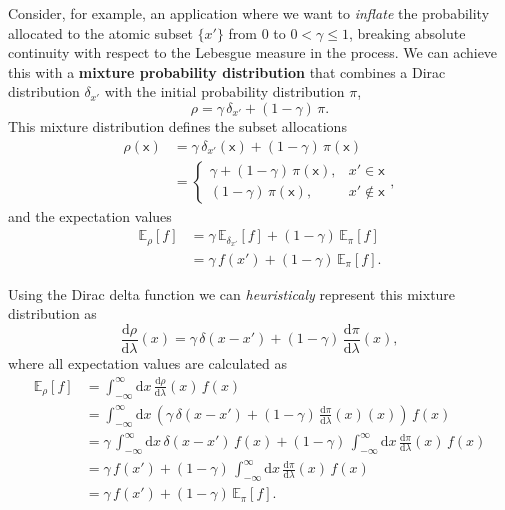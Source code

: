 \documentclass[
  letterpaper,
  DIV=11,
  numbers=noendperiod]{scrartcl}
\begin{document}
Consider, for example, an application where we want to \emph{inflate}
the probability allocated to the atomic subset \(\{ x' \}\) from \(0\)
to \(0 < \gamma \le 1\), breaking absolute continuity with respect to
the Lebesgue measure in the process. We can achieve this with a
\textbf{mixture probability distribution} that combines a Dirac
distribution \(\delta_{x'}\) with the initial probability distribution
\(\pi\), \[
\rho = \gamma \, \delta_{x'} + (1 - \gamma) \, \pi.
\] This mixture distribution defines the subset allocations
\begin{align*}
\rho(\mathsf{x})
&=
  \gamma \, \delta_{x'}(\mathsf{x})
+ (1 - \gamma) \, \pi(\mathsf{x})
\\
&=
\left\{
\begin{array}{rr}
\gamma + (1 - \gamma) \, \pi(\mathsf{x}), & x' \in \mathsf{x} \\
(1 - \gamma) \, \pi(\mathsf{x}), & x' \notin \mathsf{x}
\end{array}
\right. ,
\end{align*} and the expectation values \begin{align*}
\mathbb{E}_{\rho}[f]
&=
  \gamma \, \mathbb{E}_{\delta_{x'}}[f]
+ (1 - \gamma) \, \mathbb{E}_{\pi}[f]
\\
&=
\gamma \, f(x') + (1 - \gamma) \, \mathbb{E}_{\pi}[f].
\end{align*}

Using the Dirac delta function we can \emph{heuristicaly} represent this
mixture distribution as \[
\frac{\mathrm{d} \rho}{\mathrm{d} \lambda}(x)
=   \gamma \, \delta(x - x')
  + (1 - \gamma) \, \frac{\mathrm{d} \pi}{\mathrm{d} \lambda}(x),
\] where all expectation values are calculated as \begin{align*}
\mathbb{E}_{\rho}[f]
&=
\int_{-\infty}^{\infty} \mathrm{d} x \,
\frac{\mathrm{d} \rho}{\mathrm{d} \lambda}(x) \, f(x)
\\
&=
\int_{-\infty}^{\infty} \mathrm{d} x \,
\left(
  \gamma \, \delta(x - x') +
  (1 - \gamma) \, \frac{\mathrm{d} \pi}{\mathrm{d} \lambda}(x)(x)
\right) \, f(x)
\\
&=
\gamma \, \int_{-\infty}^{\infty} \mathrm{d} x \,
\delta(x - x') \, f(x)
+ (1 - \gamma) \,
\int_{-\infty}^{\infty} \mathrm{d} x \,
\frac{\mathrm{d} \pi}{\mathrm{d} \lambda}(x) \, f(x)
\\
&=
\gamma \, f(x')
+ (1 - \gamma) \,
\int_{-\infty}^{\infty} \mathrm{d} x \,
\frac{\mathrm{d} \pi}{\mathrm{d} \lambda}(x) \, f(x)
\\
&=
\gamma \, f(x') + (1 - \gamma) \, \mathbb{E}_{\pi}[f].
\end{align*}
\end{document}
